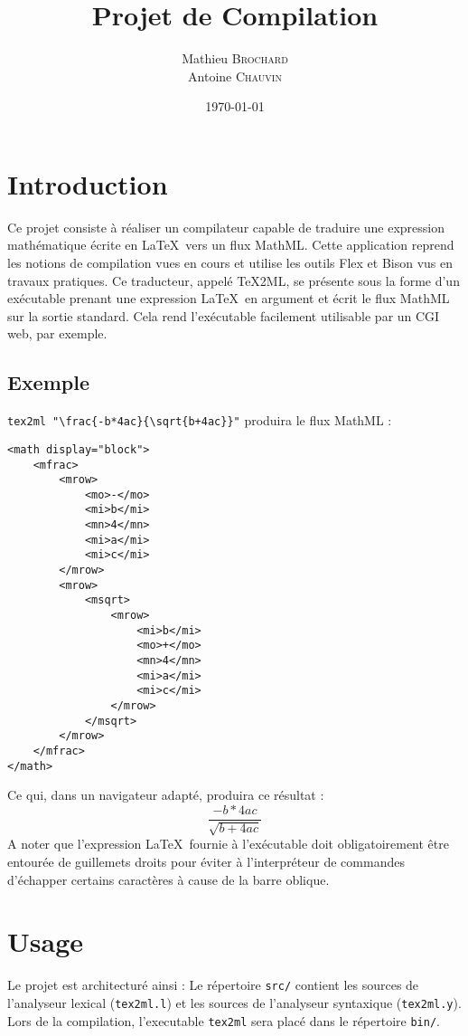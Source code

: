 \documentclass{article}
\title{Projet de Compilation}
\author{Mathieu \textsc{Brochard} \\ Antoine \textsc{Chauvin}}
\date{\today}
\begin{document}
\maketitle

\section{Introduction}
Ce projet consiste à réaliser un compilateur capable de traduire une expression mathématique écrite en \LaTeX\ vers un flux MathML. Cette application reprend les notions de compilation vues en cours et utilise les outils Flex et Bison vus en travaux pratiques. Ce traducteur, appelé TeX2ML, se présente sous la forme d'un exécutable prenant une expression \LaTeX\ en argument et écrit le flux MathML sur la sortie standard. Cela rend l'exécutable facilement utilisable par un CGI web, par exemple.

\subsection*{Exemple}
\verb|tex2ml "\frac{-b*4ac}{\sqrt{b+4ac}}"| produira le flux MathML :
\begin{verbatim}
<math display="block">
    <mfrac>
        <mrow>
            <mo>-</mo>
            <mi>b</mi>
            <mn>4</mn>
            <mi>a</mi>
            <mi>c</mi>
        </mrow>
        <mrow>
            <msqrt>
                <mrow>
                    <mi>b</mi>
                    <mo>+</mo>
                    <mn>4</mn>
                    <mi>a</mi>
                    <mi>c</mi>
                </mrow>
            </msqrt>
        </mrow>
    </mfrac>
</math>    
\end{verbatim}

Ce qui, dans un navigateur adapté, produira ce résultat :
{\Large$$\frac{-b*4ac}{\sqrt{b+4ac}}$$}
A noter que l'expression \LaTeX\ fournie à l'exécutable doit obligatoirement être entourée de guillemets droits pour éviter à l'interpréteur de commandes d'échapper certains caractères à cause de la barre oblique.

\section{Usage}
Le projet est architecturé ainsi :
\vspace{.2cm}
\vspace{.2cm}
Le répertoire \verb|src/| contient les sources de l'analyseur lexical (\verb|tex2ml.l|) et les sources de l'analyseur syntaxique (\verb|tex2ml.y|). Lors de la compilation, l'executable \verb|tex2ml| sera placé dans le répertoire \verb|bin/|.\\
\end{document}
